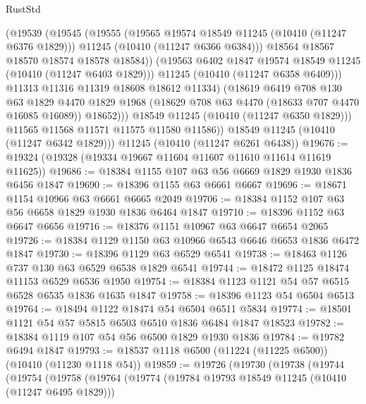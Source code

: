 \begin{lexlean}{RustStd}
\begin{coremodule}
                    (@19539
                      (@19545
                        (@19555
                          (@19565 @19574 @18549 @11245 (@10410 (@11247 @6376 @1829)))
                          @11245
                          (@10410 (@11247 @6366 @6384)))
                        @18564
                        @18567
                        @18570
                        @18574
                        @18578
                        @18584))
                    (@19563 @6402 @1847 @19574 @18549 @11245 (@10410 (@11247 @6403 @1829)))
                    @11245
                    (@10410 (@11247 @6358 @6409)))
                  @11313
                  @11316
                  @11319
                  @18608
                  @18612
                  @11334)
                (@18619
                  @6419
                  @708
                  @130
                  @63
                  @1829
                  @4470
                  @1829
                  @1968
                  (@18629 @708 @63 @4470 (@18633 @707 @4470 @16085 @16089))
                  @18652)))
            @18549
            @11245
            (@10410 (@11247 @6350 @1829)))
          @11565
          @11568
          @11571
          @11575
          @11580
          @11586))
      @18549
      @11245
      (@10410 (@11247 @6342 @1829)))
    @11245
    (@10410 (@11247 @6261 @6438))
@19676 := @19324 (@19328 (@19334 @19667 @11604 @11607 @11610 @11614 @11619 @11625))
@19686 := @18384 @1155 @107 @63 @56 @6669 @1829 @1930 @1836 @6456 @1847
@19690 := @18396 @1155 @63 @6661 @6667
@19696 := @18671 @1154 @10966 @63 @6661 @6665 @2049
@19706 := @18384 @1152 @107 @63 @56 @6658 @1829 @1930 @1836 @6464 @1847
@19710 := @18396 @1152 @63 @6647 @6656
@19716 := @18376 @1151 @10967 @63 @6647 @6654 @2065
@19726 := @18384 @1129 @1150 @63 @10966 @6543 @6646 @6653 @1836 @6472 @1847
@19730 := @18396 @1129 @63 @6529 @6541
@19738 := @18463 @1126 @737 @130 @63 @6529 @6538 @1829 @6541
@19744 := @18472 @1125 @18474 @11153 @6529 @6536 @1950
@19754 := @18384 @1123 @1121 @54 @57 @6515 @6528 @6535 @1836 @1635 @1847
@19758 := @18396 @1123 @54 @6504 @6513
@19764 := @18494 @1122 @18474 @54 @6504 @6511 @5834
@19774 := @18501 @1121 @54 @57 @5815 @6503 @6510 @1836 @6484 @1847 @18523
@19782 := @18384 @1119 @107 @54 @56 @6500 @1829 @1930 @1836
@19784 := @19782 @6494 @1847
@19793 := @18537 @1118 @6500 (@11224 (@11225 @6500)) (@10410 (@11230 @1118 @54))
@19859 := @19726
    (@19730
      (@19738
        (@19744
          (@19754
            (@19758
              (@19764
                (@19774
                  (@19784 @19793 @18549 @11245 (@10410 (@11247 @6495 @1829)))

\end{coremodule}
\end{lexlean}
